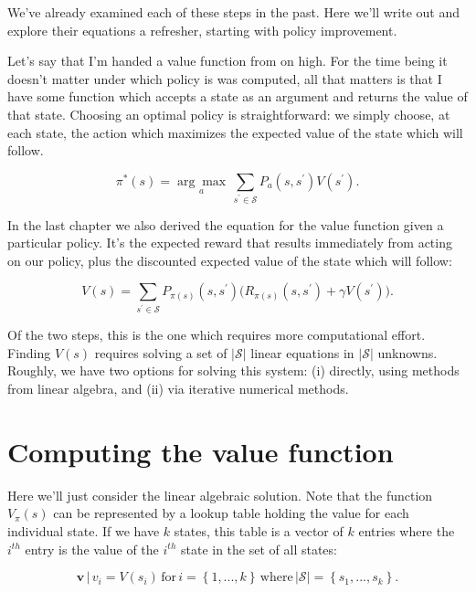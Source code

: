 \documentclass[12pt]{article}
\begin{document}
We've already examined each of these steps in the past. Here we'll write out and explore their equations a refresher, starting with policy improvement.

Let's say that I'm handed a value function from on high. For the time being it doesn't matter under which policy is was computed, all that matters is that I have some function which accepts a state as an argument and returns the value of that state. Choosing an optimal policy is straightforward: we simply choose, at each state, the action which maximizes the expected value of the state which will follow. 

\begin{equation}
\pi^*(s) = \underset{a}{\arg\max} \, \sum_{s^\prime \in \mathscr{S}} P_a(s, s^\prime) V(s^\prime).
\end{equation}

In the last chapter we also derived the equation for the value function given a particular policy. It's the expected reward that results immediately from acting on our policy, plus the discounted expected value of the state which will follow:

\begin{equation}
\label{eq:value} V(s) = \sum_{s^\prime \in \mathscr{S}} P_{\pi(s)}(s, s^\prime) \Big(R_{\pi(s)}(s, s^\prime) + \gamma V(s^\prime)\Big).
\end{equation}

Of the two steps, this is the one which requires more computational effort. Finding $V(s)$ requires solving a set of $|\mathscr{S}|$ linear equations in $|\mathscr{S}|$ unknowns. Roughly, we have two options for solving this system: (i) directly, using methods from linear algebra, and (ii) via iterative numerical methods.

\section{Computing the value function}

Here we'll just consider the linear algebraic solution. Note that the function $V_\pi(s)$ can be represented by a lookup table holding the value for each individual state. If we have $k$ states, this table is a vector of $k$ entries where the $i^{th}$ entry is the value of the $i^{th}$ state in the set of all states:

\begin{equation}
\mathbf{v} \, | \, v_i = V(s_i) \, \mbox{for} \, i = \left\{1, ..., k\right\} \, \mbox{where} \, |\mathscr{S}| = \left\{s_1, ..., s_k\right\}.
\end{equation}
\end{document}

